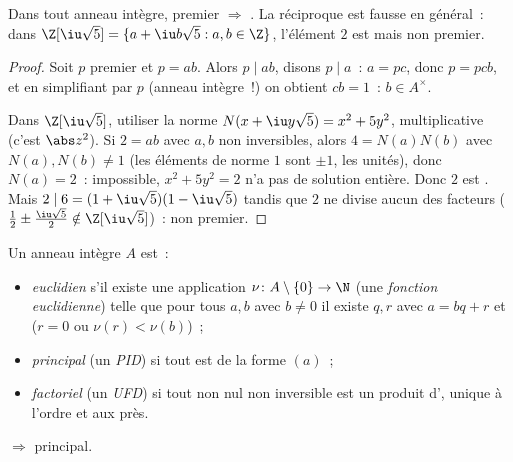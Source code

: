 \begin{proposition}\label{prop:b3:rings:primeirred}
Dans tout anneau intègre, premier $\Rightarrow$ . La
réciproque est fausse en général~: dans $\Z[\iu\sqrt 5] = \{a +
\iu b\sqrt5 : a, b \in \Z\}$, l'élément $2$ est 
mais non premier.
\end{proposition}

\begin{proof}
Soit $p$ premier et $p = ab$. Alors $p \mid ab$, disons $p \mid
a$~: $a = pc$, donc $p = pcb$, et en simplifiant par $p$ (anneau
intègre~!) on obtient $cb = 1$~: $b \in A^\times$.

Dans $\Z[\iu\sqrt5]$, utiliser la norme $N(x + \iu y\sqrt 5) =
x^2 + 5y^2$, multiplicative (c'est $\abs z^2$). Si $2 = ab$ avec
$a, b$ non inversibles, alors $4 = N(a)N(b)$ avec $N(a), N(b)
\neq 1$ (les éléments de norme $1$ sont $\pm1$, les unités),
donc $N(a) = 2$~: impossible, $x^2 + 5y^2 = 2$ n'a pas de
solution entière. Donc $2$ est . Mais $2 \mid 6 = (1
+ \iu\sqrt5)(1 - \iu\sqrt5)$ tandis que $2$ ne divise aucun des
facteurs ($\frac12 \pm \frac{\iu\sqrt5}2 \notin
\Z[\iu\sqrt5]$)~: non premier.
\end{proof}

\begin{definition}\label{def:b3:rings:pidufd}
Un anneau intègre $A$ est~:
\begin{itemize}
  \item \emph{euclidien} s'il existe une
        application $\nu \colon A \setminus \{0\} \to \N$ (une
        \emph{fonction euclidienne}) telle que pour tous $a, b$
        avec $b \ne 0$ il existe $q, r$ avec $a = bq + r$ et ($r
        = 0$ ou $\nu(r) < \nu(b)$)~;
  \item \emph{principal} (un \emph{PID})
        si tout  est de la forme $(a)$~;
  \item \emph{factoriel} (un \emph{UFD})
        si tout non nul non inversible est un produit
        d', unique à l'ordre et aux  près.
\end{itemize}
\end{definition}

\begin{theorem}\label{thm:b3:rings:euclideanpid}
 $\Rightarrow$ principal.
\end{theorem}

